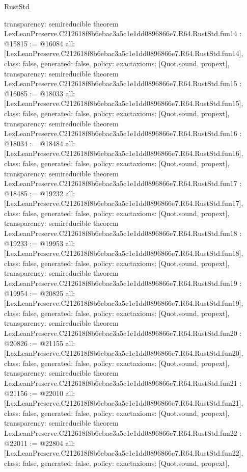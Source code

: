 \begin{lexlean}{RustStd}
\begin{coremodule}
{  transparency: semireducible
}
theorem LexLeanPreserve.C212618f8b6ebac3a5c1e1dd0896866e7.R64.RustStd.fun14 : @15815 := @16084 {
  all: [LexLeanPreserve.C212618f8b6ebac3a5c1e1dd0896866e7.R64.RustStd.fun14],
  class: false,
  generated: false,
  policy: exact{axioms: [Quot.sound, propext]},
  transparency: semireducible
}
theorem LexLeanPreserve.C212618f8b6ebac3a5c1e1dd0896866e7.R64.RustStd.fun15 : @16085 := @18033 {
  all: [LexLeanPreserve.C212618f8b6ebac3a5c1e1dd0896866e7.R64.RustStd.fun15],
  class: false,
  generated: false,
  policy: exact{axioms: [Quot.sound, propext]},
  transparency: semireducible
}
theorem LexLeanPreserve.C212618f8b6ebac3a5c1e1dd0896866e7.R64.RustStd.fun16 : @18034 := @18484 {
  all: [LexLeanPreserve.C212618f8b6ebac3a5c1e1dd0896866e7.R64.RustStd.fun16],
  class: false,
  generated: false,
  policy: exact{axioms: [Quot.sound, propext]},
  transparency: semireducible
}
theorem LexLeanPreserve.C212618f8b6ebac3a5c1e1dd0896866e7.R64.RustStd.fun17 : @18485 := @19232 {
  all: [LexLeanPreserve.C212618f8b6ebac3a5c1e1dd0896866e7.R64.RustStd.fun17],
  class: false,
  generated: false,
  policy: exact{axioms: [Quot.sound, propext]},
  transparency: semireducible
}
theorem LexLeanPreserve.C212618f8b6ebac3a5c1e1dd0896866e7.R64.RustStd.fun18 : @19233 := @19953 {
  all: [LexLeanPreserve.C212618f8b6ebac3a5c1e1dd0896866e7.R64.RustStd.fun18],
  class: false,
  generated: false,
  policy: exact{axioms: [Quot.sound, propext]},
  transparency: semireducible
}
theorem LexLeanPreserve.C212618f8b6ebac3a5c1e1dd0896866e7.R64.RustStd.fun19 : @19954 := @20825 {
  all: [LexLeanPreserve.C212618f8b6ebac3a5c1e1dd0896866e7.R64.RustStd.fun19],
  class: false,
  generated: false,
  policy: exact{axioms: [Quot.sound, propext]},
  transparency: semireducible
}
theorem LexLeanPreserve.C212618f8b6ebac3a5c1e1dd0896866e7.R64.RustStd.fun20 : @20826 := @21155 {
  all: [LexLeanPreserve.C212618f8b6ebac3a5c1e1dd0896866e7.R64.RustStd.fun20],
  class: false,
  generated: false,
  policy: exact{axioms: [Quot.sound, propext]},
  transparency: semireducible
}
theorem LexLeanPreserve.C212618f8b6ebac3a5c1e1dd0896866e7.R64.RustStd.fun21 : @21156 := @22010 {
  all: [LexLeanPreserve.C212618f8b6ebac3a5c1e1dd0896866e7.R64.RustStd.fun21],
  class: false,
  generated: false,
  policy: exact{axioms: [Quot.sound, propext]},
  transparency: semireducible
}
theorem LexLeanPreserve.C212618f8b6ebac3a5c1e1dd0896866e7.R64.RustStd.fun22 : @22011 := @22804 {
  all: [LexLeanPreserve.C212618f8b6ebac3a5c1e1dd0896866e7.R64.RustStd.fun22],
  class: false,
  generated: false,
  policy: exact{axioms: [Quot.sound, propext]},
}
\end{coremodule}
\end{lexlean}
